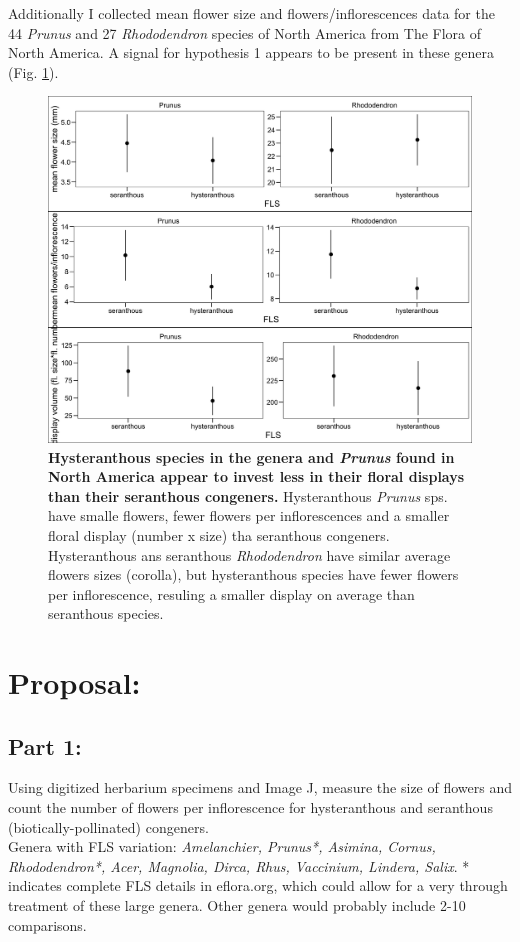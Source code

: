 \documentclass[12pt]{article}
\begin{document}
Additionally I collected mean flower size and flowers/inflorescences data for the 44 \textit{Prunus} and 27 \textit{Rhododendron} species of North America from The Flora of North America. A signal for hypothesis 1 appears to be present in these genera (Fig. \ref{fig:prunus}).

\begin{figure}[h!]
    \centering
 \includegraphics[width=\textwidth]{prelim_plot.png}
    \caption{\textbf{Hysteranthous species in the genera  and \textit{Prunus} found in North America appear to invest less in their floral displays than their seranthous congeners.} Hysteranthous \textit{Prunus} sps. have smalle flowers, fewer flowers per inflorescences and a smaller floral display (number x size) tha seranthous congeners. Hysteranthous ans seranthous \textit{Rhododendron} have similar average flowers sizes (corolla), but hysteranthous species have fewer flowers per inflorescence, resuling a smaller display on average than seranthous species. } 
    \label{fig:prunus}
\end{figure}

\section{Proposal:}
\subsection{Part 1:}
Using digitized herbarium specimens and Image J, measure the size of flowers and count the number of flowers per inflorescence for hysteranthous and seranthous (biotically-pollinated) congeners.\\
Genera with FLS variation: \emph{Amelanchier, Prunus*, Asimina, Cornus, Rhododendron*, Acer, Magnolia, Dirca, Rhus, Vaccinium, Lindera, Salix}. * indicates complete FLS details in eflora.org, which could allow for a very through treatment of these large genera. Other genera would probably include 2-10 comparisons.\\
\end{document}

